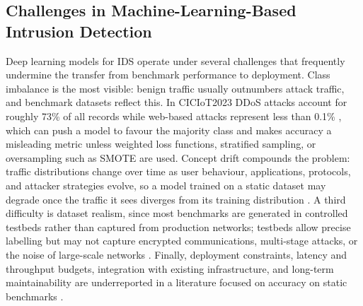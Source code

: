 \subsection{Challenges in Machine-Learning-Based Intrusion Detection}
\label{subsec:ids_challenges}

\par Deep learning models for IDS operate under several challenges that frequently undermine the transfer from benchmark performance to deployment. Class imbalance is the most visible: benign traffic usually outnumbers attack traffic, and benchmark datasets reflect this. In CICIoT2023 DDoS attacks account for roughly 73\% of all records while web-based attacks represent less than 0.1\% \cite{CICIoT2023}, which can push a model to favour the majority class and makes accuracy a misleading metric unless weighted loss functions, stratified sampling, or oversampling such as SMOTE \cite{Chawla2002} are used. Concept drift compounds the problem: traffic distributions change over time as user behaviour, applications, protocols, and attacker strategies evolve, so a model trained on a static dataset may degrade once the traffic it sees diverges from its training distribution \cite{Andresini2021}. A third difficulty is dataset realism, since most benchmarks are generated in controlled testbeds rather than captured from production networks; testbeds allow precise labelling but may not capture encrypted communications, multi-stage attacks, or the noise of large-scale networks \cite{Lansky2021}. Finally, deployment constraints, latency and throughput budgets, integration with existing infrastructure, and long-term maintainability are underreported in a literature focused on accuracy on static benchmarks \cite{Apruzzese2023}.
